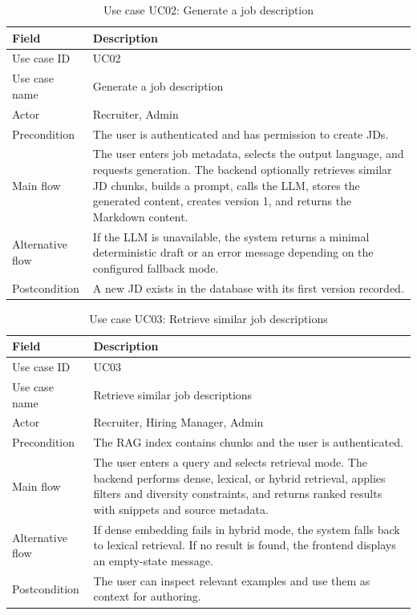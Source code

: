 \documentclass[12pt,a4paper,oneside]{report}
\begin{document}
\begin{longtable}{p{3.4cm}p{10.7cm}}
\caption{Use case UC02: Generate a job description}\label{tab:uc-generate-jd}\\
\toprule
\textbf{Field} & \textbf{Description}\\
\midrule
Use case ID & UC02\\
Use case name & Generate a job description\\
Actor & Recruiter, Admin\\
Precondition & The user is authenticated and has permission to create JDs.\\
Main flow & The user enters job metadata, selects the output language, and requests generation. The backend optionally retrieves similar JD chunks, builds a prompt, calls the LLM, stores the generated content, creates version 1, and returns the Markdown content.\\
Alternative flow & If the LLM is unavailable, the system returns a minimal deterministic draft or an error message depending on the configured fallback mode.\\
Postcondition & A new JD exists in the database with its first version recorded.\\
\bottomrule
\end{longtable}

\begin{longtable}{p{3.4cm}p{10.7cm}}
\caption{Use case UC03: Retrieve similar job descriptions}\label{tab:uc-retrieve}\\
\toprule
\textbf{Field} & \textbf{Description}\\
\midrule
Use case ID & UC03\\
Use case name & Retrieve similar job descriptions\\
Actor & Recruiter, Hiring Manager, Admin\\
Precondition & The RAG index contains chunks and the user is authenticated.\\
Main flow & The user enters a query and selects retrieval mode. The backend performs dense, lexical, or hybrid retrieval, applies filters and diversity constraints, and returns ranked results with snippets and source metadata.\\
Alternative flow & If dense embedding fails in hybrid mode, the system falls back to lexical retrieval. If no result is found, the frontend displays an empty-state message.\\
Postcondition & The user can inspect relevant examples and use them as context for authoring.\\
\bottomrule
\end{longtable}
\end{document}
